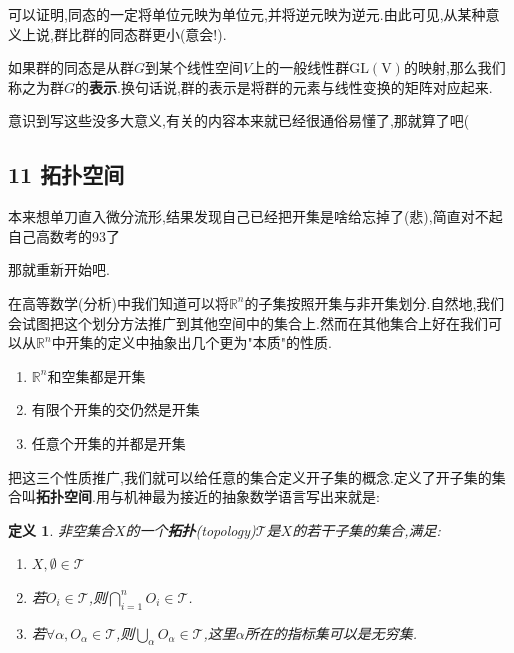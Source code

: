 \documentclass[UTF8]{article}
\begin{document}
	可以证明,同态的一定将单位元映为单位元,并将逆元映为逆元.由此可见,从某种意义上说,群比群的同态群更小(意会!).
	
	如果群的同态是从群$G$到某个线性空间$V$上的一般线性群$\mathrm{GL(V)}$的映射,那么我们称之为群$G$的\textbf{表示}.换句话说,群的表示是将群的元素与线性变换的矩阵对应起来.
	
	意识到写这些没多大意义,有关的内容本来就已经很通俗易懂了,那就算了吧(
	
	\newpage
	
	
	
	
	
	
	
\subsection*{11 拓扑空间\cite{LiangKunMiao}}
	
	本来想单刀直入微分流形,结果发现自己已经把开集是啥给忘掉了(悲),简直对不起自己高数考的93了
	
	那就重新开始吧.
	
	在高等数学(分析)中我们知道可以将$\mathbb{R}^n$的子集按照开集与非开集划分.自然地,我们会试图把这个划分方法推广到其他空间中的集合上.然而在其他集合上好在我们可以从$\mathbb{R}^n$中开集的定义中抽象出几个更为"本质"的性质.
	
	\begin{enumerate}
		\item $\mathbb{R}^n$和空集都是开集
		\item 有限个开集的交仍然是开集
		\item 任意个开集的并都是开集
	\end{enumerate}
	
	把这三个性质推广,我们就可以给任意的集合定义开子集的概念.定义了开子集的集合叫\textbf{拓扑空间}.用与机神最为接近的抽象数学语言写出来就是:
	
	\newtheorem*{topology}{定义}
	
	\begin{topology}
		
		非空集合$X$的一个\textbf{拓扑}(topology)$\mathscr{T}$是$X$的若干子集的集合,满足:
		
		\begin{enumerate}
			
			\item $X, \emptyset \in \mathscr{T}$
			
			\item 若$O_i \in \mathscr{T}$,则$\bigcap_{i=1}^n O_{i} \in \mathscr{T}$.
			
			\item 若$\forall \alpha, O_{\alpha} \in \mathscr{T}$,则$\bigcup_{\alpha} O_{\alpha} \in \mathscr{T}$,这里$\alpha$所在的指标集可以是无穷集.
		\end{enumerate}
		
	\end{topology}
	
\end{document}
